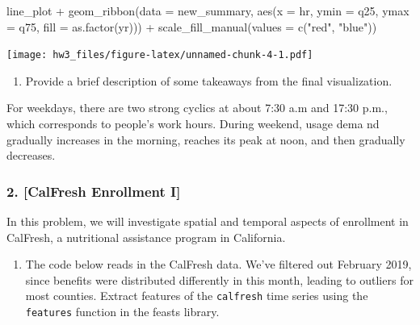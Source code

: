 \documentclass[
]{article}
\newenvironment{Shaded}{\begin{snugshade}}{\end{snugshade}}
\newcommand{\AttributeTok}[1]{\textcolor[rgb]{0.77,0.63,0.00}{#1}}
\newcommand{\FunctionTok}[1]{\textcolor[rgb]{0.00,0.00,0.00}{#1}}
\newcommand{\NormalTok}[1]{#1}
\newcommand{\SpecialCharTok}[1]{\textcolor[rgb]{0.00,0.00,0.00}{#1}}
\newcommand{\StringTok}[1]{\textcolor[rgb]{0.31,0.60,0.02}{#1}}
\providecommand{\tightlist}{%
  \setlength{\itemsep}{0pt}\setlength{\parskip}{0pt}}
\begin{document}
\begin{Shaded}
\begin{Highlighting}[]
\NormalTok{line\_plot }\SpecialCharTok{+}
  \FunctionTok{geom\_ribbon}\NormalTok{(}\AttributeTok{data =}\NormalTok{ new\_summary, }
              \FunctionTok{aes}\NormalTok{(}\AttributeTok{x =}\NormalTok{ hr, }\AttributeTok{ymin =}\NormalTok{ q25, }\AttributeTok{ymax =}\NormalTok{ q75, }\AttributeTok{fill =} \FunctionTok{as.factor}\NormalTok{(yr))) }\SpecialCharTok{+}
  \FunctionTok{scale\_fill\_manual}\NormalTok{(}\AttributeTok{values =} \FunctionTok{c}\NormalTok{(}\StringTok{"red"}\NormalTok{, }\StringTok{"blue"}\NormalTok{))}
\end{Highlighting}
\end{Shaded}

\texttt{[image: hw3\_files/figure-latex/unnamed-chunk-4-1.pdf]}

\begin{enumerate}
\def\labelenumi{\alph{enumi}.}
\setcounter{enumi}{3}
\tightlist
\item
  Provide a brief description of some takeaways from the final
  visualization.
\end{enumerate}

For weekdays, there are two strong cyclics at about 7:30 a.m and 17:30
p.m., which corresponds to people's work hours. During weekend, usage
dema nd gradually increases in the morning, reaches its peak at noon,
and then gradually decreases.

\hypertarget{calfresh-enrollment-i}{%
\subsubsection{2. {[}CalFresh Enrollment
I{]}}\label{calfresh-enrollment-i}}

In this problem, we will investigate spatial and temporal aspects of
enrollment in CalFresh, a nutritional assistance program in California.

\begin{enumerate}
\def\labelenumi{\alph{enumi}.}
\tightlist
\item
  The code below reads in the CalFresh data. We've filtered out February
  2019, since benefits were distributed differently in this month,
  leading to outliers for most counties. Extract features of the
  \texttt{calfresh} time series using the \texttt{features} function in
  the feasts library.
\end{enumerate}
\end{document}
